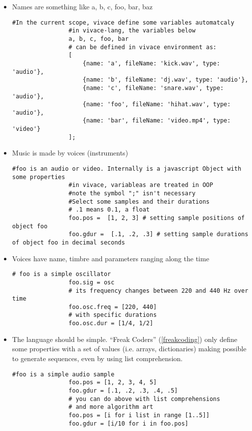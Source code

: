 \documentclass[letterpaper, 12pt]{article}
\begin{document}
\begin{itemize}
\item Names are something like a, b, c, foo, bar, baz
        \begin{Verbatim}[fontfamily=courier, xleftmargin=\parindent]
                #In the current scope, vivace define some variables automatcaly
                #in vivace-lang, the variables below
                a, b, c, foo, bar
                # can be defined in vivace environment as:
                [
                    {name: 'a', fileName: 'kick.wav', type: 'audio'},
                    {name: 'b', fileName: 'dj.wav', type: 'audio'},
                    {name: 'c', fileName: 'snare.wav', type: 'audio'},
                    {name: 'foo', fileName: 'hihat.wav', type: 'audio'},
                    {name: 'bar', fileName: 'video.mp4', type: 'video'}
                ];
            \end{Verbatim}
\item Music is made by voices (instruments)
            \begin{Verbatim}[fontfamily=courier, xleftmargin=\parindent]
                #foo is an audio or video. Internally is a javascript Object with some properties
                #in vivace, variableas are treated in OOP
                #note the symbol ";" isn't necessary
                #Select some samples and their durations
                # .1 means 0.1, a float
                foo.pos =  [1, 2, 3] # setting sample positions of object foo
                foo.gdur =  [.1, .2, .3] # setting sample durations of object foo in decimal seconds
            \end{Verbatim}
\item Voices have name, timbre and parameters ranging along the time
            
            \begin{Verbatim}[fontfamily=courier, xleftmargin=\parindent]
                # foo is a simple oscillator
                foo.sig = osc
                # its frequency changes between 220 and 440 Hz over time
                foo.osc.freq = [220, 440]
                # with specific durations
                foo.osc.dur = [1/4, 1/2]
            \end{Verbatim}
            
            
\item The language should be simple. ``Freak Coders'' (\ref{freakcoding}) only define some properties with a set of values (i.e. arrays, dictionaries) making possible to generate sequences, even by using list comprehension.
            \begin{Verbatim}[fontfamily=courier, xleftmargin=\parindent]
                #foo is a simple audio sample
                foo.pos = [1, 2, 3, 4, 5]
                foo.gdur = [.1, .2, .3, .4, .5]
                # you can do above with list comprehensions 
                # and more algorithm art
                foo.pos = [i for i list in range [1..5]]
                foo.gdur = [i/10 for i in foo.pos]
            \end{Verbatim}
            

\end{itemize}
\end{document}
